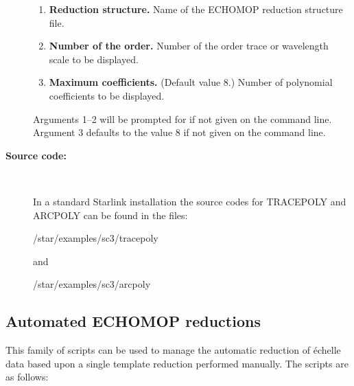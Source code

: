 \documentclass[twoside,11pt]{starlink}
\providecommand{\scspec}[2]{#1}
\begin{document}
\begin{description}
\begin{enumerate}

\item \textbf{Reduction structure.}
      Name of the ECHOMOP reduction structure file.

\item \textbf{Number of the order.}
      Number of the order trace or wavelength scale to be displayed.

\item \textbf{Maximum coefficients.}  (Default value 8.)
      Number of polynomial coefficients to be displayed.

\end{enumerate}

     Arguments 1\scspec{--}{-}2
     will be prompted for if not given on the command line.\\
     Argument  3   defaults to the value 8 if not given on the command line.

\item [\textbf{Source code:}] \mbox{} \\
\begin{latexonly}
In a standard Starlink installation the source codes for TRACEPOLY and
ARCPOLY can be found in the files:
\begin{terminalv}
   /star/examples/sc3/tracepoly
\end{terminalv}

and

\begin{terminalv}
   /star/examples/sc3/arcpoly
\end{terminalv}
\end{latexonly}



\end{description}

\newpage
\subsection{\label{se_automated_echomop}Automated
            ECHOMOP reductions}


This family of scripts can be used to manage the automatic reduction of
\'{e}chelle data based upon a single template reduction
performed manually.  The scripts are as follows:
\end{document}
